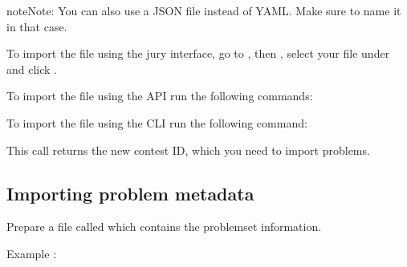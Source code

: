 \documentclass[a4paper,10pt,english,openany]{sphinxmanual}
\begin{document}
\begin{sphinxadmonition}{note}{Note:}
\sphinxAtStartPar
You can also use a JSON file instead of YAML. Make sure to name it
 in that case.
\end{sphinxadmonition}

\sphinxAtStartPar
To import the file using the jury interface, go to , then
, select your file under 
and click .

\sphinxAtStartPar
To import the file using the API run the following commands:

\begin{sphinxVerbatim}[commandchars=\\\{\}]
      
\end{sphinxVerbatim}

\sphinxAtStartPar
To import the file using the CLI run the following command:

\begin{sphinxVerbatim}[commandchars=\\\{\}]
      
\end{sphinxVerbatim}

\sphinxAtStartPar
This call returns the new contest ID, which you need to import problems.


\subsection{Importing problem metadata}
\label{\detokenize{import:importing-problem-metadata}}
\sphinxAtStartPar
Prepare a file called  which contains the problemset information.

\sphinxAtStartPar
Example :
\end{document}
